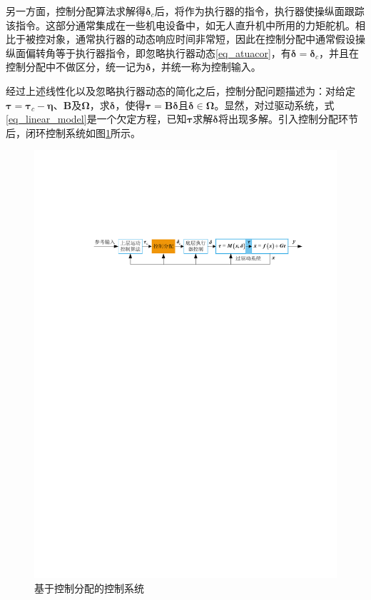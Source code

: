 另一方面，控制分配算法求解得$\bm{\delta}_c$后，将作为执行器的指令，执行器使操纵面跟踪该指令。这部分通常集成在一些机电设备中，如无人直升机中所用的力矩舵机。相比于被控对象，通常执行器的动态响应时间非常短，因此在控制分配中通常假设操纵面偏转角等于执行器指令，即忽略执行器动态\eqref{eq_atuacor}，有$\bm{\delta}=\bm{\delta}_c$，并且在控制分配中不做区分，统一记为$ \bm{\delta} $，并统一称为控制输入。

经过上述线性化以及忽略执行器动态的简化之后，控制分配问题描述为：对给定$\bm{\tau}= \bm{\tau}_c-\bm{\eta}$、$\bm{B}$及$\bm{\Omega}$，求$\bm{\delta}$，使得$\bm{\tau}=\bm{B}\bm{\delta}$且$\bm{\delta} \in \bm{\Omega}$。显然，对过驱动系统，式\eqref{eq_linear_model}是一个欠定方程，已知$ \bm{\tau} $求解$ \bm{\delta } $将出现多解。引入控制分配环节后，闭环控制系统如图\ref{fig_system}所示。
\begin{figure}[htbp]
	\centering	
	\includegraphics[scale=1]{Fig/Fig1.pdf}%
	\caption{\label{fig_system}基于控制分配的控制系统}
\end{figure}

